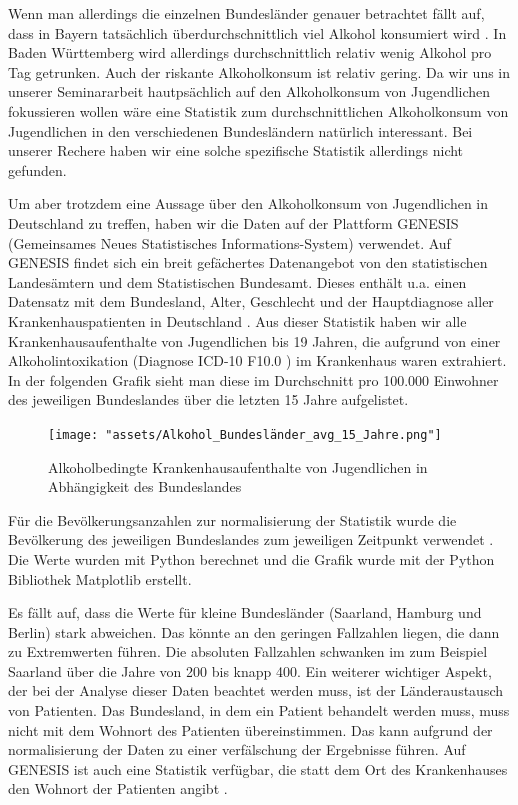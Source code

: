 \documentclass[12pt]{article}
\begin{document}
Wenn man allerdings die einzelnen Bundesländer genauer betrachtet fällt auf, dass in Bayern tatsächlich überdurchschnittlich viel Alkohol konsumiert wird \autocite{kraus_einfluss_2001}. In Baden Württemberg wird allerdings durchschnittlich relativ wenig Alkohol pro Tag getrunken. Auch der riskante Alkoholkonsum ist relativ gering. Da wir uns in unserer Seminararbeit hautpsächlich auf den Alkoholkonsum von Jugendlichen fokussieren wollen wäre eine Statistik zum durchschnittlichen Alkoholkonsum von Jugendlichen in den verschiedenen Bundesländern natürlich interessant. Bei unserer Rechere haben wir eine solche spezifische Statistik allerdings nicht gefunden. 

Um aber trotzdem eine Aussage über den Alkoholkonsum von Jugendlichen in Deutschland zu treffen, haben wir die Daten auf der Plattform GENESIS (Gemeinsames Neues Statistisches Informations-System) \autocite{noauthor_statistisches_nodate} verwendet. Auf GENESIS findet sich ein breit  gefächertes Datenangebot von den statistischen Landesämtern und dem Statistischen Bundesamt. Dieses enthält u.a. einen Datensatz mit dem Bundesland, Alter, Geschlecht und der Hauptdiagnose aller Krankenhauspatienten in Deutschland \autocite{noauthor_genesis_nodate}. Aus dieser Statistik haben wir alle Krankenhausaufenthalte von Jugendlichen bis 19 Jahren, die aufgrund von einer Alkoholintoxikation (Diagnose ICD-10 F10.0 \autocite{noauthor_icd-10-code_nodate}) im Krankenhaus waren extrahiert. In der folgenden Grafik sieht man diese im Durchschnitt pro 100.000 Einwohner des jeweiligen Bundeslandes über die letzten 15 Jahre aufgelistet.

\begin{figure}[H]
    \centering
    \texttt{[image: "assets/Alkohol\_Bundesländer\_avg\_15\_Jahre.png"]}
    \caption{Alkoholbedingte Krankenhausaufenthalte von Jugendlichen in Abhängigkeit des Bundeslandes}
    \label{fig:Krankenhausaufenthalte_1}
\end{figure}

Für die Bevölkerungsanzahlen zur normalisierung der Statistik wurde die Bevölkerung des jeweiligen Bundeslandes zum jeweiligen Zeitpunkt verwendet \autocite{noauthor_statistisches_2024}. Die Werte wurden mit Python berechnet und die Grafik wurde mit der Python Bibliothek Matplotlib \autocite{noauthor_matplotlib_nodate} erstellt. 

Es fällt auf, dass die Werte für kleine Bundesländer (Saarland, Hamburg und Berlin) stark abweichen. Das könnte an den geringen Fallzahlen liegen, die dann zu Extremwerten führen. Die absoluten Fallzahlen schwanken im zum Beispiel Saarland über die Jahre von 200 bis knapp 400. Ein weiterer wichtiger Aspekt, der bei der Analyse dieser Daten beachtet werden muss, ist der Länderaustausch von Patienten. Das Bundesland, in dem ein Patient behandelt werden muss, muss nicht mit dem Wohnort des Patienten übereinstimmen. Das kann aufgrund der normalisierung der Daten zu einer verfälschung der Ergebnisse führen. Auf GENESIS ist auch eine Statistik verfügbar, die statt dem Ort des Krankenhauses den Wohnort der Patienten angibt \autocite{noauthor_genesis_nodate-1}.
\end{document}
